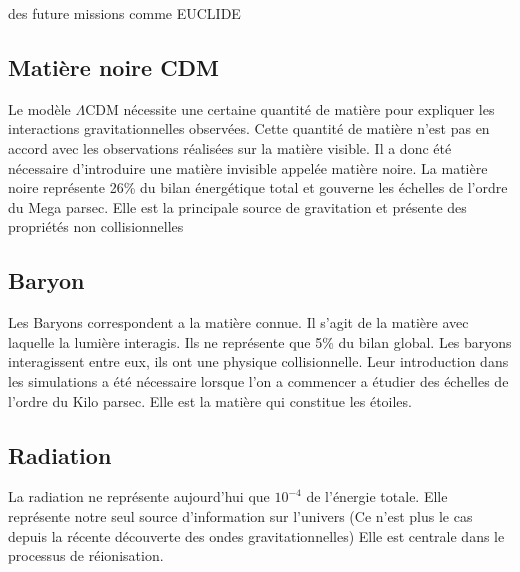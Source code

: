 des future missions comme EUCLIDE %


\subsection{Matière noire CDM}
Le modèle $\Lambda$CDM nécessite une certaine quantité de matière pour expliquer les interactions gravitationnelles observées.
Cette quantité de matière n'est pas en accord avec les observations réalisées sur la matière visible.
Il a donc été nécessaire d’introduire une matière invisible appelée matière noire.
La matière noire représente 26\% du bilan énergétique total et gouverne les échelles de l'ordre du Mega parsec.
Elle est la principale source de gravitation et présente des propriétés non collisionnelles



%
%



\subsection{Baryon}

Les Baryons correspondent a la matière connue.
Il s'agit de la matière avec laquelle la lumière interagis.
Ils ne représente que 5\% du bilan global.
Les baryons interagissent entre eux, ils ont une physique collisionnelle.
Leur introduction dans les simulations a été nécessaire lorsque l'on a commencer a étudier des échelles de l'ordre du Kilo parsec.
Elle est la matière qui constitue les étoiles.



\subsection{Radiation}

La radiation ne représente aujourd'hui que $10^{-4}$ de l'énergie totale.
Elle représente notre seul source d'information sur l'univers (Ce n'est plus le cas depuis la récente découverte des ondes gravitationnelles) %
Elle est centrale dans le processus de réionisation.

